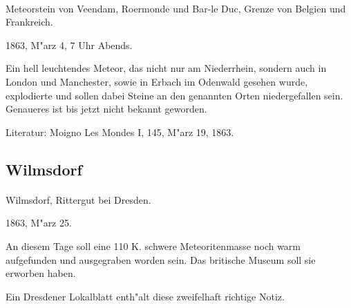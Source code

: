 \documentclass[a4paper, 11pt, oneside]{article}
\begin{document}
\paragraph{}
Meteorstein von Veendam, Roermonde und Bar-le Duc, Grenze von Belgien und Frankreich.

1863, M"arz 4, 7 Uhr Abends.

Ein hell leuchtendes Meteor, das nicht nur am Niederrhein, sondern auch in London und Manchester, sowie in Erbach im Odenwald gesehen wurde, explodierte und sollen dabei Steine an den genannten Orten niedergefallen sein. Genaueres ist bis jetzt nicht bekannt geworden.

\footnotesize
Literatur: Moigno Les Mondes I, 145, M"arz 19, 1863.

\subsection{Wilmsdorf}
\normalsize
\paragraph{}
Wilmsdorf, Rittergut bei Dresden.

1863, M"arz 25.

An diesem Tage soll eine 110 K. schwere Meteoritenmasse noch warm aufgefunden und ausgegraben worden sein. Das britische Museum soll sie erworben haben.

Ein Dresdener Lokalblatt enth"alt diese zweifelhaft richtige Notiz.
\clearpage
\end{document}
